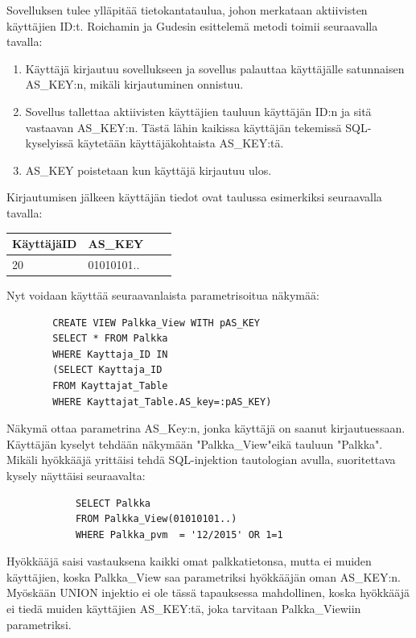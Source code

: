 \documentclass[finnish]{tktltiki2}
\theoremstyle{definition}
\theoremstyle{remark}
\begin{document}
		Sovelluksen tulee ylläpitää tietokantataulua, johon merkataan aktiivisten käyttäjien ID:t. Roichamin ja Gudesin esittelemä metodi toimii seuraavalla tavalla:
		\begin{enumerate}
			\item Käyttäjä kirjautuu sovellukseen ja sovellus palauttaa käyttäjälle satunnaisen AS\_KEY:n, mikäli kirjautuminen onnistuu.
			
			\item Sovellus tallettaa aktiivisten käyttäjien tauluun käyttäjän ID:n ja sitä vastaavan AS\_KEY:n. Tästä lähin kaikissa käyttäjän tekemissä SQL-kyselyissä käytetään käyttäjäkohtaista AS\_KEY:tä.
			
			\item AS\_KEY poistetaan kun käyttäjä kirjautuu ulos.
		\end{enumerate}
		
		Kirjautumisen jälkeen käyttäjän tiedot ovat taulussa esimerkiksi seuraavalla tavalla:
	
		\begin{center}
		\begin{tabular}{| l | l | l | l |}
			\hline
			KäyttäjäID & AS\_KEY \\ \hline
			\hline
			20 &  01010101.. \\
			\hline
		\end{tabular}
		\end{center}
	

		Nyt voidaan käyttää seuraavanlaista parametrisoitua näkymää:
		\begin{lstlisting}
		CREATE VIEW Palkka_View WITH pAS_KEY
		SELECT * FROM Palkka
		WHERE Kayttaja_ID IN
		(SELECT Kayttaja_ID
		FROM Kayttajat_Table
		WHERE Kayttajat_Table.AS_key=:pAS_KEY) 
		\end{lstlisting}
		Näkymä ottaa parametrina AS\_Key:n, jonka käyttäjä on saanut kirjautuessaan. Käyttäjän kyselyt tehdään näkymään "Palkka\_View"\space eikä tauluun "Palkka". Mikäli hyökkääjä yrittäisi tehdä SQL-injektion tautologian avulla, suoritettava kysely näyttäisi seuraavalta:
		\begin{lstlisting}
			SELECT Palkka
			FROM Palkka_View(01010101..) 
			WHERE Palkka_pvm  = '12/2015' OR 1=1
		\end{lstlisting}
		Hyökkääjä saisi vastauksena kaikki omat palkkatietonsa, mutta ei muiden käyttäjien, koska Palkka\_View saa parametriksi hyökkääjän oman AS\_KEY:n. Myöskään UNION injektio ei ole tässä tapauksessa mahdollinen, koska hyökkääjä ei tiedä muiden käyttäjien AS\_KEY:tä, joka tarvitaan Palkka\_Viewiin parametriksi.
	
\end{document}
